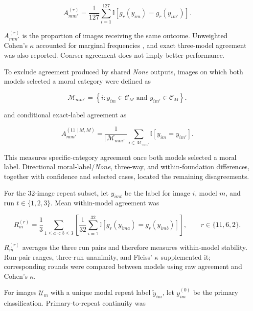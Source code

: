 \begin{equation}
A_{mm'}^{(r)}
=
\frac{1}{127}
\sum_{i=1}^{127}
\mathbb{I}\!\left[
g_r(y_{im})=g_r(y_{im'})
\right].
\end{equation}

\(A_{mm'}^{(r)}\) is the proportion of images receiving the same outcome.
Unweighted Cohen's \(\kappa\) accounted for marginal frequencies
\cite{cohen1960coefficient}, and exact three-model agreement was also
reported. Coarser agreement does not imply better performance.

To exclude agreement produced by shared \textit{None} outputs, images on which
both models selected a moral category were defined as

\begin{equation}
\mathcal{M}_{mm'}
=
\left\{
i:
y_{im}\in\mathcal{C}_{M}
\text{ and }
y_{im'}\in\mathcal{C}_{M}
\right\}.
\end{equation}

and conditional exact-label agreement as

\begin{equation}
A_{mm'}^{(11\mid M,M)}
=
\frac{1}{|\mathcal{M}_{mm'}|}
\sum_{i\in\mathcal{M}_{mm'}}
\mathbb{I}\!\left[
y_{im}=y_{im'}
\right].
\end{equation}

This measures specific-category agreement once both models selected a moral
label. Directional moral-label/\textit{None}, three-way, and within-foundation
differences, together with confidence and selected cases, located the remaining
disagreements.

For the 32-image repeat subset, let \(y_{imt}\) be the label for image \(i\),
model \(m\), and run \(t\in\{1,2,3\}\). Mean within-model agreement was

\begin{equation}
R_m^{(r)}
=
\frac{1}{3}
\sum_{1\leq a<b\leq3}
\left[
\frac{1}{32}
\sum_{i=1}^{32}
\mathbb{I}\!\left[
g_r(y_{ima})=g_r(y_{imb})
\right]
\right],
\qquad r\in\{11,6,2\}.
\end{equation}

\(R_m^{(r)}\) averages the three run pairs and therefore measures within-model
stability. Run-pair ranges, three-run unanimity, and Fleiss' \(\kappa\)
\cite{fleiss1971measuring} supplemented it; corresponding rounds were compared
between models using raw agreement and Cohen's \(\kappa\).

For images \(\mathcal{U}_m\) with a unique modal repeat label
\(\widetilde{y}_{im}\), let \(y_{im}^{(0)}\) be the primary classification.
Primary-to-repeat continuity was

